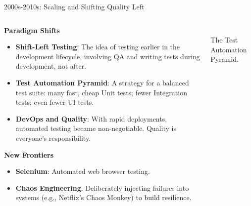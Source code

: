 \documentclass{beamer}
\begin{document}
\begin{frame}[t]{2000s-2010s: Scaling and Shifting Quality Left}
\begin{columns}
    \begin{column}{0.6\textwidth}
        \textbf{Paradigm Shifts}
        \begin{itemize}
            \item \textbf{Shift-Left Testing}: The idea of testing earlier in the development lifecycle, involving QA and writing tests during development, not after.
            \item \textbf{Test Automation Pyramid}: A strategy for a balanced test suite: many fast, cheap Unit tests; fewer Integration tests; even fewer UI tests.
            \item \textbf{DevOps and Quality}: With rapid deployments, automated testing became non-negotiable. Quality is everyone's responsibility.
        \end{itemize}
        \textbf{New Frontiers}
        \begin{itemize}
            \item \textbf{Selenium}: Automated web browser testing.
            \item \textbf{Chaos Engineering}: Deliberately injecting failures into systems (e.g., Netflix's Chaos Monkey) to build resilience.
        \end{itemize}
    \end{column}
    \begin{column}{0.4\textwidth}
        \\\scriptsize{The Test Automation Pyramid.}
    \end{column}
\end{columns}
\end{frame}
\end{document}
